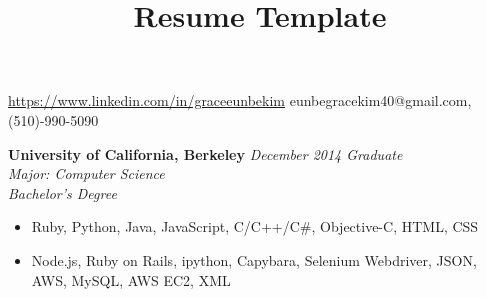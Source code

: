 \documentclass[9pt]{extarticle}
\title{Resume Template}
\begin{document}

{\url{https://www.linkedin.com/in/graceeunbekim}}
{eunbegracekim40@gmail.com, (510)-990-5090}
\vspace{-12pt}
\begin{body}
	\textbf{University of California, Berkeley} 
    \hfill 
    \emph{December 2014 Graduate}\\
	\emph{Major: Computer Science}\\
	\emph{Bachelor's Degree}
\end{body}

\begin{body}
	\begin{itemize}
    \itemsep -2pt
	\item Ruby, Python, Java, JavaScript, C/C++/C\#, Objective-C, HTML, CSS  
	\item Node.js, Ruby on Rails, ipython, Capybara, Selenium Webdriver, JSON, AWS, MySQL, AWS EC2, XML
	\end{itemize}
\end{body}
\end{document}
